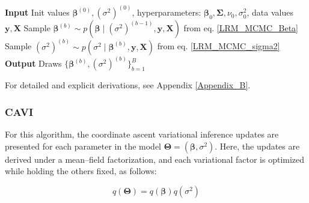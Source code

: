 \begin{algorithm}[H]
\caption{Gibbs Sampling for LRM}
\begin{algorithmic}
\State \textbf{Input} Init values $\bm{\beta}^{(0)}, (\sigma^2)^{(0)}$, hyperparameters: $\bm{\beta}_0,\bm{\Sigma},\nu_0,\sigma_0^2$, data values $\bm{y},\bm{X}$
    \State Sample $\bm{\beta}^{(b)} \sim p\left(\bm{\beta} \mid (\sigma^2)^{(b-1)},\bm{y},\bm{X}\right)$ from eq. \ref{LRM_MCMC_Beta}
    \State Sample $(\sigma^2)^{(b)} \sim p\left(\sigma^{2} \mid \bm{\beta}^{(b)},\bm{y},\bm{X}\right)$ from eq. \ref{LRM_MCMC_sigma2}
\EndFor
\State \textbf{Output} Draws $\{\bm{\beta}^{(b)}, (\sigma^2)^{(b)}\}_{b=1}^{B}$ 
\end{algorithmic}
\end{algorithm}

For detailed and explicit derivations, see Appendix \ref{Appendix_B}.


\subsubsection{CAVI}

For this algorithm, the coordinate ascent variational inference updates are presented for each parameter in the model $\bm{\Theta} = (\bm{\beta}, \sigma^2)$. Here, the updates are derived under a mean--field factorization, and each variational factor is optimized while holding the others fixed, as follows:

\begin{equation}
\label{Q_LRM}
q\left(\bm{\Theta}\right)=q(\bm{\beta})q(\sigma^2)
\end{equation}
    

